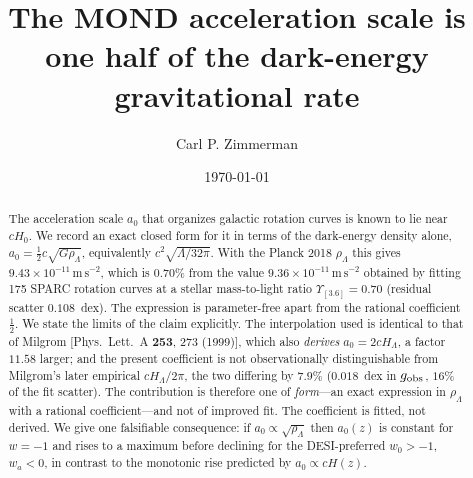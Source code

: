 \documentclass[aps,prd,reprint,amsmath,amssymb,nofootinbib,superscriptaddress]{revtex4-2}
\begin{document}
\title{The MOND acceleration scale is one half of the dark-energy gravitational rate}

\author{Carl P. Zimmerman}

\date{\today}

\begin{abstract}
The acceleration scale $a_0$ that organizes galactic rotation curves is known to lie near $cH_0$.
We record an exact closed form for it in terms of the dark-energy density alone,
$a_0 = \tfrac{1}{2}c\sqrt{G\rho_\Lambda}$, equivalently $c^2\sqrt{\Lambda/32\pi}$.
With the Planck 2018 $\rho_\Lambda$ this gives $9.43\times10^{-11}\,\mathrm{m\,s^{-2}}$, which is
$0.70\%$ from the value $9.36\times10^{-11}\,\mathrm{m\,s^{-2}}$ obtained by fitting 175 SPARC
rotation curves at a stellar mass-to-light ratio $\Upsilon_{[3.6]}=0.70$ (residual scatter
$0.108$~dex). The expression is parameter-free apart from the rational coefficient $\tfrac12$.
We state the limits of the claim explicitly. The interpolation used is identical to that of
Milgrom [Phys.\ Lett.\ A \textbf{253}, 273 (1999)], which also \emph{derives}
$a_0 = 2cH_\Lambda$, a factor $11.58$ larger; and the present coefficient is not observationally
distinguishable from Milgrom's later empirical $cH_\Lambda/2\pi$, the two differing by $7.9\%$
($0.018$~dex in $g_{\rm obs}$, $16\%$ of the fit scatter). The contribution is therefore one of
\emph{form}---an exact expression in $\rho_\Lambda$ with a rational coefficient---and not of improved
fit. The coefficient is fitted, not derived. We give one falsifiable consequence: if
$a_0\propto\sqrt{\rho_\Lambda}$ then $a_0(z)$ is constant for $w=-1$ and rises to a maximum before
declining for the DESI-preferred $w_0>-1$, $w_a<0$, in contrast to the monotonic rise predicted by
$a_0 \propto cH(z)$.
\end{abstract}

\maketitle
\end{document}
